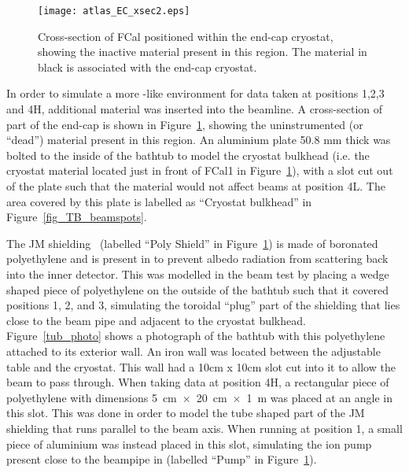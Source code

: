 \begin{figure}[tb]
\begin{center}
\texttt{[image: atlas\_EC\_xsec2.eps]}
\end{center}

\caption[End-cap cross-section]{Cross-section of FCal positioned within the end-cap cryostat, showing the inactive material present in this region. The material in black is associated with the end-cap cryostat.}
\label{end_cap_xsec_2}
\end{figure}

In order to simulate a more \atlas-like environment for data taken at positions 1,2,3 and 4H, additional material was inserted into the beamline. A cross-section of part of the \atlas end-cap is shown in Figure~\ref{end_cap_xsec_2}, showing the uninstrumented (or ``dead'') material present in this region. An aluminium plate 50.8 mm thick was bolted to the inside of the bathtub to model the cryostat bulkhead (i.e. the cryostat material located just in front of FCal1 in Figure~\ref{end_cap_xsec_2}), with a slot cut out of the plate such that the material would not affect beams at position 4L. The area covered by this plate is labelled as ``Cryostat bulkhead'' in Figure~\ref{fig_TB_beamspots}.

The \atlas JM shielding~\cite{detector_paper} (labelled ``Poly Shield'' in Figure~\ref{end_cap_xsec_2}) is made of boronated polyethylene and is present in \atlas to prevent albedo radiation from scattering back into the inner detector. This was modelled in the beam test by placing a wedge shaped piece of polyethylene on the outside of the bathtub such that it covered positions 1, 2, and 3, simulating the toroidal ``plug'' part of the shielding that lies close to the beam pipe and adjacent to the cryostat bulkhead. Figure~\ref{tub_photo} shows a photograph of the bathtub with this polyethylene attached to its exterior wall. An iron wall was located between the adjustable table and the cryostat. This wall had a 10cm x 10cm slot cut into it to allow the beam to pass through. When taking data at position 4H, a rectangular piece of polyethylene with dimensions 5~cm~$\times$~20~cm~$\times$~1~m was placed at an angle in this slot. This was done in order to model the tube shaped part of the JM shielding that runs parallel to the beam axis. When running at position 1, a small piece of aluminium was instead placed in this slot, simulating the ion pump present close to the beampipe in \atlas (labelled ``Pump'' in Figure~\ref{end_cap_xsec_2}).

